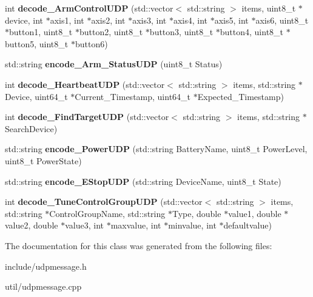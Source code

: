 \begin{DoxyCompactItemize}
\item 
\mbox{\label{classUDPMessageHandler_a27acc94f1bb6a867fcc468364fdb575b}} 
int {\bfseries decode\+\_\+\+Arm\+Control\+U\+DP} (std\+::vector$<$ std\+::string $>$ items, uint8\+\_\+t $\ast$device, int $\ast$axis1, int $\ast$axis2, int $\ast$axis3, int $\ast$axis4, int $\ast$axis5, int $\ast$axis6, uint8\+\_\+t $\ast$button1, uint8\+\_\+t $\ast$button2, uint8\+\_\+t $\ast$button3, uint8\+\_\+t $\ast$button4, uint8\+\_\+t $\ast$button5, uint8\+\_\+t $\ast$button6)
\item 
\mbox{\label{classUDPMessageHandler_aa27a414179487796de0e17cc14084a0a}} 
std\+::string {\bfseries encode\+\_\+\+Arm\+\_\+\+Status\+U\+DP} (uint8\+\_\+t Status)
\item 
\mbox{\label{classUDPMessageHandler_a66067e749983c515b8d74402eb1dc930}} 
int {\bfseries decode\+\_\+\+Heartbeat\+U\+DP} (std\+::vector$<$ std\+::string $>$ items, std\+::string $\ast$Device, uint64\+\_\+t $\ast$Current\+\_\+\+Timestamp, uint64\+\_\+t $\ast$Expected\+\_\+\+Timestamp)
\item 
\mbox{\label{classUDPMessageHandler_ad7017dd642faaae03038f6c5c607d6ed}} 
int {\bfseries decode\+\_\+\+Find\+Target\+U\+DP} (std\+::vector$<$ std\+::string $>$ items, std\+::string $\ast$Search\+Device)
\item 
\mbox{\label{classUDPMessageHandler_a231d62e9db643dec3d1e5b8cb5532187}} 
std\+::string {\bfseries encode\+\_\+\+Power\+U\+DP} (std\+::string Battery\+Name, uint8\+\_\+t Power\+Level, uint8\+\_\+t Power\+State)
\item 
\mbox{\label{classUDPMessageHandler_ac6cddadbade29b297872b71f7d5c12d5}} 
std\+::string {\bfseries encode\+\_\+\+E\+Stop\+U\+DP} (std\+::string Device\+Name, uint8\+\_\+t State)
\item 
\mbox{\label{classUDPMessageHandler_a93d928deced7833e0f6b013f7ce86bfa}} 
int {\bfseries decode\+\_\+\+Tune\+Control\+Group\+U\+DP} (std\+::vector$<$ std\+::string $>$ items, std\+::string $\ast$Control\+Group\+Name, std\+::string $\ast$Type, double $\ast$value1, double $\ast$value2, double $\ast$value3, int $\ast$maxvalue, int $\ast$minvalue, int $\ast$defaultvalue)
\end{DoxyCompactItemize}


The documentation for this class was generated from the following files\+:\begin{DoxyCompactItemize}
\item 
include/udpmessage.\+h\item 
util/udpmessage.\+cpp\end{DoxyCompactItemize}
